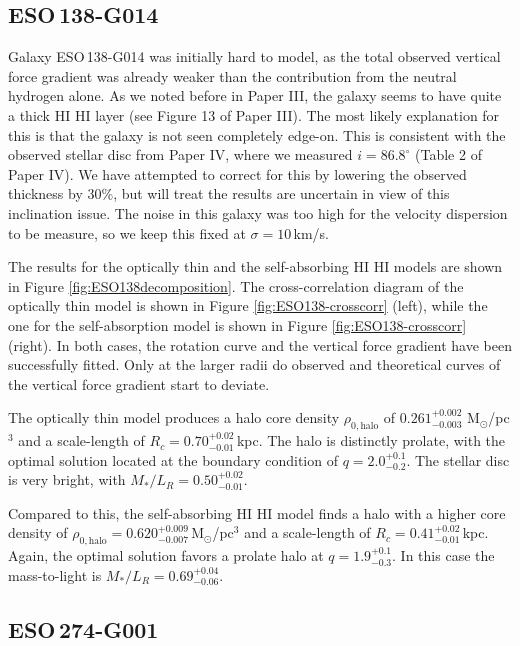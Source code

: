 \documentclass[useAMS,usenatbib]{mn2e}
\newcommand{\hi}{%
  \relax
  \ifmmode
    \textrm{\textsc{HI}}
  \else
    \textsc{H{\smaller}I}
  \fi
}
\begin{document}
\subsection{ESO\,138-G014}\label{sec:DM138}

Galaxy ESO\,138-G014 was initially hard to model, as the total observed 
vertical force gradient was already weaker than the contribution from  
the neutral hydrogen alone.
As we noted before in Paper III, the galaxy seems to 
have quite a thick \hi layer (see Figure 13 of Paper III). 
The most likely explanation for this is that the galaxy is not seen 
completely edge-on.
This is consistent with the observed stellar disc from Paper IV, 
where we measured $i=86.8^\circ$ (Table 2 of Paper IV).
We have attempted to correct for this by lowering the observed thickness 
by 30\%, but will treat the results are uncertain in view of this
inclination issue.
The noise in this galaxy was too high for the velocity dispersion to be 
measure, so we keep this fixed at $\sigma=10$\,km/s.

The results for the optically thin and the self-absorbing \hi models are 
shown in Figure \ref{fig:ESO138decomposition}.
The cross-correlation diagram of the optically thin model is shown in 
Figure \ref{fig:ESO138-crosscorr} (left), while the one for the self-absorption 
model is shown in Figure \ref{fig:ESO138-crosscorr} (right).
In both cases, the rotation curve and the vertical force gradient have 
been successfully fitted.
Only at the larger radii do observed and theoretical curves 
of the vertical force gradient start to deviate.

The optically thin model produces a halo core density 
$\rho_{0,\textrm{halo}}$ of $0.261^{+0.002}_{-0.003}$ M$_\odot$/pc$^3$ 
and a scale-length of $R_c =0.70^{+0.02}_{-0.01}$\,kpc.
The halo is distinctly prolate, with the optimal solution 
located at the boundary condition of $q =2.0^{+0.1}_{-0.2}$.
The stellar disc is very bright, with $M_*/L_R=0.50^{+0.02}_{-0.01}$.

Compared to this, the self-absorbing \hi model finds a halo 
with a higher core density of 
$\rho_{0,\textrm{halo}} = 0.620^{+0.009}_{-0.007}$\,M$_\odot$/pc$^3$ and 
a scale-length of $R_c  = 0.41_{-0.01}^{+0.02}$\,kpc.
Again, the optimal solution favors a prolate halo at $q =1.9^{+0.1}_{-0.3}$.
In this case the mass-to-light is $M_*/L_{R}= 0.69^{+0.04}_{-0.06}$.


\subsection{ESO\,274-G001}
\end{document}
